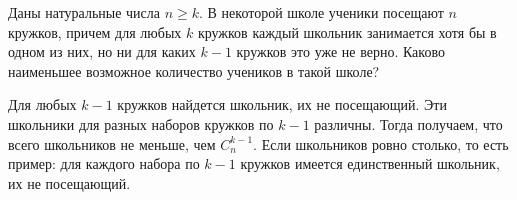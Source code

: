 Даны натуральные числа $n \geq k$.
В некоторой школе ученики посещают $n$ кружков, причем для любых $k$ кружков
каждый школьник занимается хотя бы в одном из них, но ни для каких $k - 1$
кружков это уже не верно.
Каково наименьшее возможное количество учеников в такой школе?

\solution
Для любых $k - 1$ кружков найдется школьник, их не посещающий.
Эти школьники для разных наборов кружков по $k - 1$ различны.
Тогда получаем, что всего школьников не меньше, чем $C_{n}^{k - 1}$.
Если школьников ровно столько, то есть пример: для каждого набора по $k - 1$
кружков имеется единственный школьник, их не посещающий.

